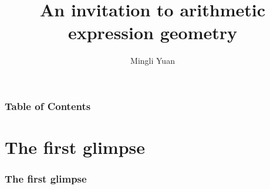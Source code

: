 \documentclass[aspectratio=169]{beamer}
\title{An invitation to arithmetic expression geometry}
\author[Author] {Mingli Yuan}
\begin{document}
\pgfplotsset{compat=1.18}

\begin{frame}
\maketitle
\end{frame}

\begin{frame}
\frametitle{Table of Contents}
\tableofcontents
\end{frame}

\section{The first glimpse}

\begin{frame}
\frametitle{The first glimpse}
\begin{figure}[ht]\centering
{}
\end{figure}
\end{frame}
\end{document}
